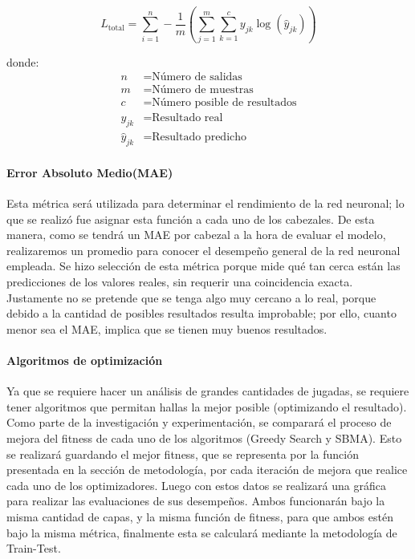 \[ L_{\text{total}} = \sum_{i=1}^{n} -\frac{1}{m} \left( \sum_{j=1}^{m} \sum_{k=1}^{c} y_{jk} \log(\hat{y}_{jk}) \right) \]

donde: 
\begin{align*} 
n &= \text{Número de salidas} \\ 
m &= \text{Número de muestras} \\ 
c &= \text{Número posible de resultados} \\ y_{jk} &= \text{Resultado real} \\ \hat{y}_{jk} &= \text{Resultado predicho} \end{align*}

\paragraph{Error Absoluto Medio(MAE)}
Esta métrica será utilizada para determinar el rendimiento de la red neuronal; lo que se realizó fue asignar esta función a cada uno de los cabezales. De esta manera, como se tendrá un MAE por cabezal a la hora de evaluar el modelo, realizaremos un promedio para conocer el desempeño general de la red neuronal empleada. Se hizo selección de esta métrica porque mide qué tan cerca están las predicciones de los valores reales, sin requerir una coincidencia exacta. Justamente no se pretende que se tenga algo muy cercano a lo real, porque debido a la cantidad de posibles resultados resulta improbable; por ello, cuanto menor sea el MAE, implica que se tienen muy buenos resultados.

\paragraph{Algoritmos de optimización}

Ya que se requiere hacer un análisis de grandes cantidades de jugadas, se requiere tener algoritmos que permitan hallas la mejor posible (optimizando el resultado). Como parte de la investigación y experimentación, se comparará el proceso de mejora del fitness de cada uno de los algoritmos (Greedy Search y SBMA). Esto se realizará guardando el mejor fitness, que se representa por la función presentada en la sección de metodología, por cada iteración de mejora que realice cada uno de los optimizadores. Luego con estos datos se realizará una gráfica para realizar las evaluaciones de sus desempeños. Ambos funcionarán bajo la misma cantidad de capas, y la misma función de fitness, para que ambos estén bajo la misma métrica, finalmente esta se calculará mediante la metodología de Train-Test.

